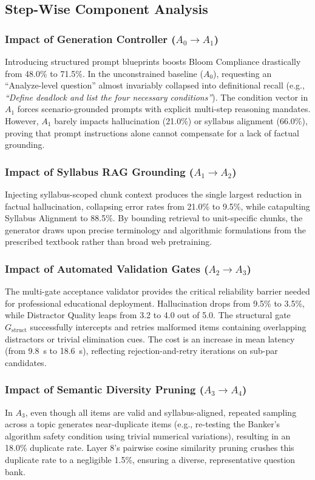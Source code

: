 \documentclass[conference]{IEEEtran}
\begin{document}
\subsection{Step-Wise Component Analysis}

\subsubsection{Impact of Generation Controller ($A_0 \to A_1$)}
Introducing structured prompt blueprints boosts Bloom Compliance drastically from 48.0\% to 71.5\%. In the unconstrained baseline ($A_0$), requesting an ``Analyze-level question'' almost invariably collapsed into definitional recall (e.g., \textit{``Define deadlock and list the four necessary conditions''}). The condition vector in $A_1$ forces scenario-grounded prompts with explicit multi-step reasoning mandates. However, $A_1$ barely impacts hallucination (21.0\%) or syllabus alignment (66.0\%), proving that prompt instructions alone cannot compensate for a lack of factual grounding.

\subsubsection{Impact of Syllabus RAG Grounding ($A_1 \to A_2$)}
Injecting syllabus-scoped chunk context produces the single largest reduction in factual hallucination, collapsing error rates from 21.0\% to 9.5\%, while catapulting Syllabus Alignment to 88.5\%. By bounding retrieval to unit-specific chunks, the generator draws upon precise terminology and algorithmic formulations from the prescribed textbook rather than broad web pretraining.

\subsubsection{Impact of Automated Validation Gates ($A_2 \to A_3$)}
The multi-gate acceptance validator provides the critical reliability barrier needed for professional educational deployment. Hallucination drops from 9.5\% to 3.5\%, while Distractor Quality leaps from 3.2 to 4.0 out of 5.0. The structural gate $G_{\text{struct}}$ successfully intercepts and retries malformed items containing overlapping distractors or trivial elimination cues. The cost is an increase in mean latency (from 9.8~s to 18.6~s), reflecting rejection-and-retry iterations on sub-par candidates.

\subsubsection{Impact of Semantic Diversity Pruning ($A_3 \to A_4$)}
In $A_3$, even though all items are valid and syllabus-aligned, repeated sampling across a topic generates near-duplicate items (e.g., re-testing the Banker's algorithm safety condition using trivial numerical variations), resulting in an 18.0\% duplicate rate. Layer 8's pairwise cosine similarity pruning crushes this duplicate rate to a negligible 1.5\%, ensuring a diverse, representative question bank.
\end{document}
